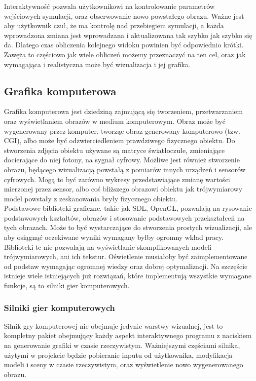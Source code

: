 \documentclass{article} %
\begin{document}
        Interaktywność pozwala użytkownikowi na kontrolowanie parametrów wejściowych symulacji, oraz obserwowanie nowo powstałego obrazu. Ważne jest aby użytkownik czuł, że ma kontrolę nad przebiegiem symulacji, a każda wprowadzona zmiana jest wprowadzana i aktualizowana tak szybko jak szybko się da. Dlatego czas obliczenia kolejnego widoku powinien być odpowiednio krótki. Zawęża to częściowo jak wiele obliczeń możemy przeznaczyć na ten cel, oraz jak wymagająca i realistyczna może być wizualizacja i jej grafika. 
        \\
                
    \subsection{Grafika komputerowa}
        Grafika komputerowa jest dziedziną zajmującą się tworzeniem, przetwarzaniem oraz wyświetlaniem obrazów w medium komputerowym. Obraz może być wygenerowany przez komputer, tworząc obraz generowany komputerowo (tzw. CGI), albo może być odzwierciedleniem prawdziwego fizycznego obiektu. Do stworzenia zdjęcia obiektu używane są matryce światłoczułe, zmieniające docierające do niej fotony, na sygnał cyfrowy. Możliwe jest również stworzenie obrazu, będącego wizualizacją powstałą z pomiarów innych urządzeń i sensorów cyfrowych. Mogą to być zarówno wykresy przedstawiające zmianę wartości mierzonej przez sensor, albo coś bliższego obrazowi obiektu jak trójwymiarowy model powstały z zeskanowania bryły fizycznego obiektu.
        \\
        
        Podstawowe biblioteki graficzne, takie jak SDL, OpenGL, pozwalają na rysowanie podstawowych kształtów, obrazów i stosowanie podstawowych przekształceń na tych obrazach. Może to być wystarczające do stworzenia prostych wizualizacji, ale aby osiągnąć oczekiwane wyniki wymagany byłby ogromny wkład pracy. Biblioteki te nie pozwalają na wyświetlanie skomplikowanych modeli trójwymiarowych, ani ich tekstur. Oświetlenie musiałoby być zaimplementowane od podstaw wymagając ogromnej wiedzy oraz dobrej optymalizacji. Na szczęście istnieje wiele istniejących już rozwiązań, które implementują wszystkie wymagane funkcje, są to silniki gier komputerowych.
        \\

        
        \subsubsection{Silniki gier komputerowych}
        Silnik gry komputerowej nie obejmuje jedynie warstwy wizualnej, jest to kompletny pakiet obejmujący każdy aspekt interaktywnego programu z naciskiem na generowanie grafiki w czasie rzeczywistym. Ważniejszymi częściami silnika, użytymi w projekcie będzie pobieranie inputu od użytkownika, modyfikacja modeli i sceny w czasie rzeczywistym, oraz wyświetlenie nowo wygenerowanego obrazu.
        \\
        
\end{document}
